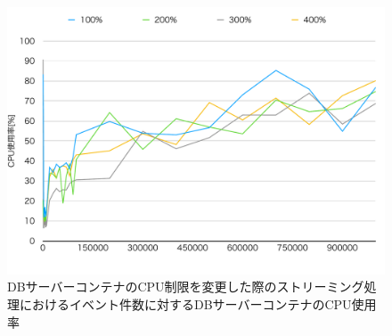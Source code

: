 \documentclass[../../../../../main]{subfiles}
\begin{document}
    \begin{figure}[H]
        \centering
        \includegraphics[width=12cm]{graph}
        \caption{DBサーバーコンテナのCPU制限を変更した際のストリーミング処理におけるイベント件数に対するDBサーバーコンテナのCPU使用率}
        \label{fig:stream-change-db-cpu-limit-db-cpu-app_4_8192-db_1024}
    \end{figure}
\end{document}

